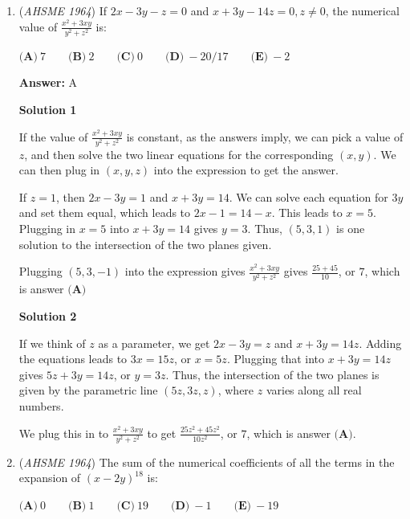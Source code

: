 \begin{enumerate}
 Plugging $-6b = c$ into $bc = -6$ gives $b(-6b) = -6$, or $b^2 = 1$.  This means $b = \pm 1$  This in turn gives $c = \mp 6$.  Thus, $(b, c) = (\pm 1, \mp 6)$, for two solutions, which is answer $\boxed{\textbf{(C)}}$



	\item (\textit{AHSME 1964}) If $2x-3y-z=0$ and $x+3y-14z=0, z \neq 0$, the numerical value of $\frac{x^2+3xy}{y^2+z^2}$ is:


 $\textbf{(A)}\ 7\qquad \textbf{(B)}\ 2\qquad \textbf{(C)}\ 0\qquad \textbf{(D)}\ -20/17\qquad \textbf{(E)}\ -2$

 \textbf{Answer: }A



\textbf{Solution 1}

If the value of $\frac{x^2+3xy}{y^2+z^2}$ is constant, as the answers imply, we can pick a value of $z$, and then solve the two linear equations for the corresponding $(x, y)$.  We can then plug in $(x,y, z)$ into the expression to get the answer.

 If $z=1$, then $2x - 3y = 1$ and $x + 3y = 14$.  We can solve each equation for $3y$ and set them equal, which leads to $2x - 1 = 14 - x$.  This leads to $x = 5$.  Plugging in $x=5$ into $x + 3y = 14$ gives $y = 3$.  Thus, $(5, 3, 1)$ is one solution to the intersection of the two planes given.

 Plugging $(5, 3, -1)$ into the expression gives $\frac{x^2+3xy}{y^2+z^2}$ gives $\frac{25 + 45}{10}$, or $7$, which is answer $\boxed{\textbf{(A)}}$




\textbf{Solution 2}

If we think of $z$ as a parameter, we get $2x - 3y = z$ and $x + 3y = 14z$.  Adding the equations leads to $3x = 15z$, or $x = 5z$.  Plugging that into $x + 3y = 14z$ gives $5z + 3y = 14z$, or $y = 3z$.  Thus, the intersection of the two planes is given by the parametric line $(5z, 3z, z)$, where $z$ varies along all real numbers.

 We plug this in to $\frac{x^2+3xy}{y^2+z^2}$ to get $\frac{25z^2 + 45z^2}{10z^2}$, or $7$, which is answer $\boxed{\textbf{(A)}}$.

 


	\item (\textit{AHSME 1964}) The sum of the numerical coefficients of all the terms in the expansion of $(x-2y)^{18}$ is:


 $\textbf{(A)}\ 0\qquad \textbf{(B)}\ 1\qquad \textbf{(C)}\ 19\qquad \textbf{(D)}\ -1\qquad \textbf{(E)}\ -19$


\end{enumerate}
